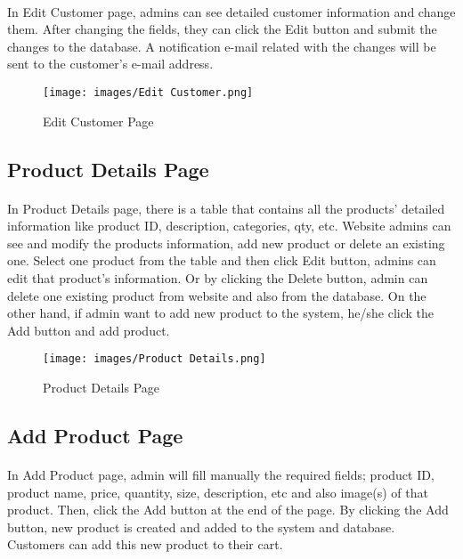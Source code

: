 \documentclass[12pt]{article}
\begin{document}
\paragraph{}
In Edit Customer page, admins can see detailed customer information and change them. After changing the fields, they can click the Edit button and submit the changes to the database. A notification e-mail related with the changes will be sent to the customer's e-mail address.  

\bigskip
\bigskip
\bigskip
\begin{figure}[h]
\centerline{\texttt{[image: images/Edit Customer.png]}}
\caption{Edit Customer Page}
\label{fig}
\end{figure}

\newpage
\subsection{Product Details Page}
\bigskip
\paragraph{}
In Product Details page, there is a table that contains all the products' detailed information like product ID, description, categories, qty, etc. Website admins can see and modify the products information, add new product or delete an existing one. Select one product from the table and then click Edit button, admins can edit that product's information. Or by clicking the Delete button, admin can delete one existing product from website and also from the database. On the other hand, if admin want to add new product to the system, he/she click the Add button and add product.
\bigskip
\bigskip
\bigskip
\begin{figure}[h]
\centerline{\texttt{[image: images/Product Details.png]}}
\caption{Product Details Page}
\label{fig}
\end{figure}

\newpage
\subsection{Add Product Page}
\bigskip
\paragraph{}
In Add Product page, admin will fill manually the required fields; product ID, product name, price, quantity, size, description, etc and also image(s) of that product. Then, click the Add button at the end of the page. By clicking the Add button, new product is created and added to the system and database. Customers can add this new product to their cart. 
\end{document}
